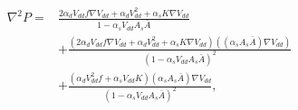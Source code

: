 \begin{appendices}
\begin{equation}\label{eq:p_transient_d2}
\begin{split}
\nabla^{2} P =&\frac{2\alpha_{d}V_{dd}f\nabla V_{dd}+\alpha_{d}V_{dd}^{2}+\alpha_{s}K\nabla V_{dd}}{1-\alpha_{s}V_{dd}A_{s}\bar{A}}\\
&+\frac{(2\alpha_{d}V_{dd}f\nabla V_{dd}+\alpha_{d}V_{dd}^{2}+\alpha_{s}K\nabla V_{dd})((\alpha_{s}A_{s}\bar{A})\nabla V_{dd} )}{(1-\alpha_{s}V_{dd}A_{s}\bar{A})^{2}}\\
&+\frac{(\alpha_{d}V_{dd}^{2}f+\alpha_{s}V_{dd}K)(\alpha_{s}A_{s}\bar{A})\nabla V_{dd} }{(1-\alpha_{s}V_{dd}A_{s}\bar{A})^{2}},
\end{split}
\end{equation}
\end{appendices}
